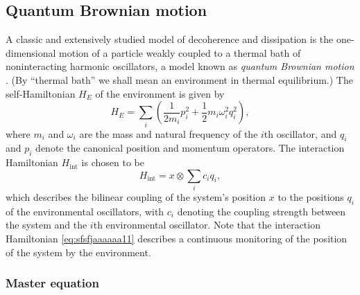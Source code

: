 \documentclass[3p,sort&compress,12pt]{elsarticle}
\newcommand{\op}[1]{#1}
\begin{document}
\subsection{\label{sec:quant-brown-moti}Quantum Brownian motion}

A classic and extensively studied model of decoherence and dissipation is the one-dimensional motion of a particle weakly coupled to a thermal bath of noninteracting harmonic oscillators, a model known as \emph{quantum Brownian motion} \cite{Kubler:1973:ux,Caldeira:1983:on,Hu:1992:om,Paz:1993:ta,Zurek:1993:pu,Weiss:1999:tv,Zurek:2002:ii,Breuer:2002:oq,Diosi:2000:yn,Joos:2003:jh,Eisert:2003:ib,Schlosshauer:2007:un}.  (By ``thermal bath'' we shall mean an environment in thermal equilibrium.) The self-Hamiltonian $\op{H}_E$ of the environment is given by
%
\begin{equation}
  \label{eq:sfsfjaa11}
  \op{H}_E = \sum_i \left( \frac{1}{2m_i}p_i^2 +
  \frac{1}{2}m_i\omega_i^2q_i^2 \right),  
\end{equation}
%
where $m_i$ and $\omega_i$ are the mass and natural frequency of the $i$th oscillator, and $q_i$ and $p_i$ denote the canonical position and momentum operators. The interaction Hamiltonian $\op{H}_\text{int}$ is chosen to be
%
\begin{equation}\label{eq:sfsfjaaaaaa11}
\op{H}_\text{int} = x \otimes \sum_i c_i q_i,
\end{equation}
%
which describes the bilinear coupling of the system's position $x$ to the positions $q_i$ of the environmental oscillators, with $c_i$ denoting the coupling strength between the system and the $i$th environmental oscillator. Note that the interaction Hamiltonian \eqref{eq:sfsfjaaaaaa11} describes a continuous monitoring of the position of the system by the environment. 

\subsubsection{Master equation} 
\end{document}
